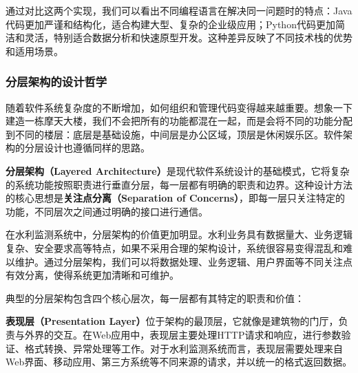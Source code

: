\begin{Shaded}
\begin{Highlighting}[]
\OperatorTok{=} \NormalTok{(}
        \NormalTok{ \{}
            \NormalTok{: }\NormalTok{(}
            \NormalTok{: }
            \NormalTok{: }
            \NormalTok{: }\OperatorTok{/} 
            \NormalTok{: }
\NormalTok{        \}}
\end{Highlighting}
\end{Shaded}

通过对比这两个实现，我们可以看出不同编程语言在解决同一问题时的特点：Java代码更加严谨和结构化，适合构建大型、复杂的企业级应用；Python代码更加简洁和灵活，特别适合数据分析和快速原型开发。这种差异反映了不同技术栈的优势和适用场景。

\subsubsection{分层架构的设计哲学}\label{ux5206ux5c42ux67b6ux6784ux7684ux8bbeux8ba1ux54f2ux5b66}

随着软件系统复杂度的不断增加，如何组织和管理代码变得越来越重要。想象一下建造一栋摩天大楼，我们不会把所有的功能都混在一起，而是会将不同的功能分配到不同的楼层：底层是基础设施，中间层是办公区域，顶层是休闲娱乐区。软件架构的分层设计也遵循同样的思路。

\textbf{分层架构（Layered Architecture）}是现代软件系统设计的基础模式，它将复杂的系统功能按照职责进行垂直分层，每一层都有明确的职责和边界。这种设计方法的核心思想是\textbf{关注点分离（Separation of Concerns）}，即每一层只关注特定的功能，不同层次之间通过明确的接口进行通信。

在水利监测系统中，分层架构的价值更加明显。水利业务具有数据量大、业务逻辑复杂、安全要求高等特点，如果不采用合理的架构设计，系统很容易变得混乱和难以维护。通过分层架构，我们可以将数据处理、业务逻辑、用户界面等不同关注点有效分离，使得系统更加清晰和可维护。

典型的分层架构包含四个核心层次，每一层都有其特定的职责和价值：

\textbf{表现层（Presentation Layer）}位于架构的最顶层，它就像是建筑物的门厅，负责与外界的交互。在Web应用中，表现层主要处理HTTP请求和响应，进行参数验证、格式转换、异常处理等工作。对于水利监测系统而言，表现层需要处理来自Web界面、移动应用、第三方系统等不同来源的请求，并以统一的格式返回数据。

